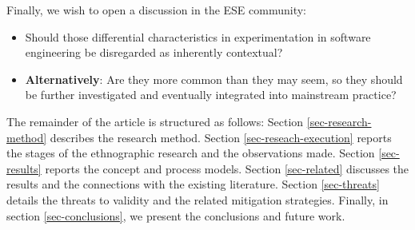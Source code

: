 Finally, we wish to open a discussion in the ESE community: 
\begin{itemize}
  \item Should those differential characteristics in experimentation in software engineering be disregarded as inherently contextual?
  \item  \textbf{Alternatively}: Are they more common than they may seem, so they should be further investigated and eventually integrated into mainstream practice?
\end{itemize}

The remainder of the article is structured as follows: Section \ref{sec-research-method} describes the research method. Section \ref{sec-reseach-execution} reports the stages of the ethnographic research and the observations made. Section \ref{sec-results} reports the concept and process models. Section \ref{sec-related} discusses the results and the connections with the existing literature. Section \ref{sec-threats} details the threats to validity and the related mitigation strategies. Finally, in section \ref{sec-conclusions}, we present the conclusions and future work.